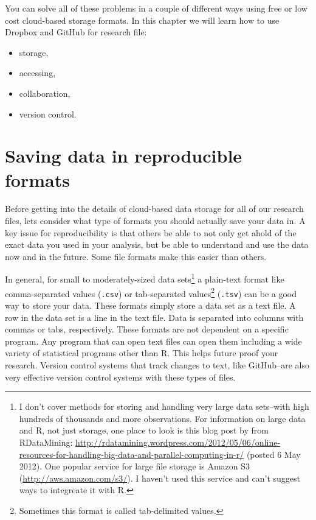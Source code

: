 You can solve all of these problems in a couple of different ways using free or low cost cloud-based storage formats. In this chapter we will learn how to use Dropbox and GitHub for research file:

\begin{itemize}
    \item storage,
    \item accessing,
    \item collaboration,
    \item version control.
\end{itemize}

\section{Saving data in reproducible formats}

Before getting into the details of cloud-based data storage for all of our research files, lets consider what type of formats you should actually save your data in. A key issue for reproducibility is that others be able to not only get ahold of the exact data you used in your analysis, but be able to understand and use the data now and in the future. Some file formats make this easier than others.

In general, for small to moderately-sized data sets\footnote{I don't cover methods for storing and handling very large data sets--with high hundreds of thousands and more observations. For information on large data and R, not just storage, one place to look is this blog post by from RDataMining: \url{http://rdatamining.wordpress.com/2012/05/06/online-resources-for-handling-big-data-and-parallel-computing-in-r/} (posted 6 May 2012). One popular service for large file storage is Amazon S3 (\url{http://aws.amazon.com/s3/}). I haven't used this service and can't suggest ways to integreate it with R.} a plain-text format like comma-separated values (\texttt{.csv}) or tab-separated values\footnote{Sometimes this format is called tab-delimited values.} (\texttt{.tsv}) can be a good way to store your data. These formats simply store a data set as a text file. A row in the data set is a line in the text file. Data is separated into columns with commas or tabs, respectively. These formats are not dependent on a specific program. Any program that can open text files can open them including a wide variety of statistical programs other than R. This helps future proof your research. Version control systems that track changes to text, like GitHub--are also very effective version control systems with these types of files. 

